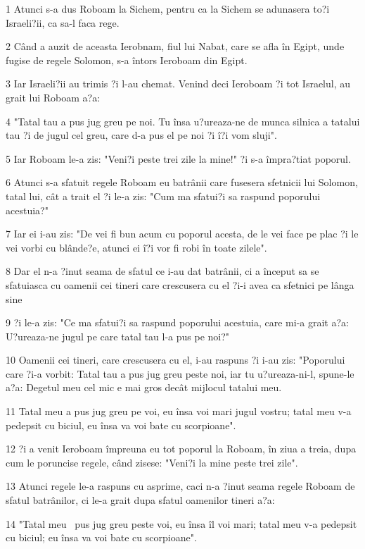 \par 1 Atunci s-a dus Roboam la Sichem, pentru ca la Sichem se adunasera to?i Israeli?ii, ca sa-l faca rege.
\par 2 Când a auzit de aceasta Ierobnam, fiul lui Nabat, care se afla în Egipt, unde fugise de regele Solomon, s-a întors Ieroboam din Egipt.
\par 3 Iar Israeli?ii au trimis ?i l-au chemat. Venind deci Ieroboam ?i tot Israelul, au grait lui Roboam a?a:
\par 4 "Tatal tau a pus jug greu pe noi. Tu însa u?ureaza-ne de munca silnica a tatalui tau ?i de jugul cel greu, care d-a pus el pe noi ?i î?i vom sluji".
\par 5 Iar Roboam le-a zis: "Veni?i peste trei zile la mine!" ?i s-a împra?tiat poporul.
\par 6 Atunci s-a sfatuit regele Roboam eu batrânii care fusesera sfetnicii lui Solomon, tatal lui, cât a trait el ?i le-a zis: "Cum ma sfatui?i sa raspund poporului acestuia?"
\par 7 Iar ei i-au zis: "De vei fi bun acum cu poporul acesta, de le vei face pe plac ?i le vei vorbi cu blânde?e, atunci ei î?i vor fi robi în toate zilele".
\par 8 Dar el n-a ?inut seama de sfatul ce i-au dat batrânii, ci a început sa se sfatuiasca cu oamenii cei tineri care crescusera cu el ?i-i avea ca sfetnici pe lânga sine
\par 9 ?i le-a zis: "Ce ma sfatui?i sa raspund poporului acestuia, care mi-a grait a?a: U?ureaza-ne jugul pe care tatal tau l-a pus pe noi?"
\par 10 Oamenii cei tineri, care crescusera cu el, i-au raspuns ?i i-au zis: "Poporului care ?i-a vorbit: Tatal tau a pus jug greu peste noi, iar tu u?ureaza-ni-l, spune-le a?a: Degetul meu cel mic e mai gros decât mijlocul tatalui meu.
\par 11 Tatal meu a pus jug greu pe voi, eu însa voi mari jugul vostru; tatal meu v-a pedepsit cu biciul, eu însa va voi bate cu scorpioane".
\par 12 ?i a venit Ieroboam împreuna eu tot poporul la Roboam, în ziua a treia, dupa cum le poruncise regele, când zisese: "Veni?i la mine peste trei zile".
\par 13 Atunci regele le-a raspuns cu asprime, caci n-a ?inut seama regele Roboam de sfatul batrânilor, ci le-a grait dupa sfatul oamenilor tineri a?a:
\par 14 "Tatal meu  pus jug greu peste voi, eu însa îl voi mari; tatal meu v-a pedepsit cu biciul; eu însa va voi bate cu scorpioane".
